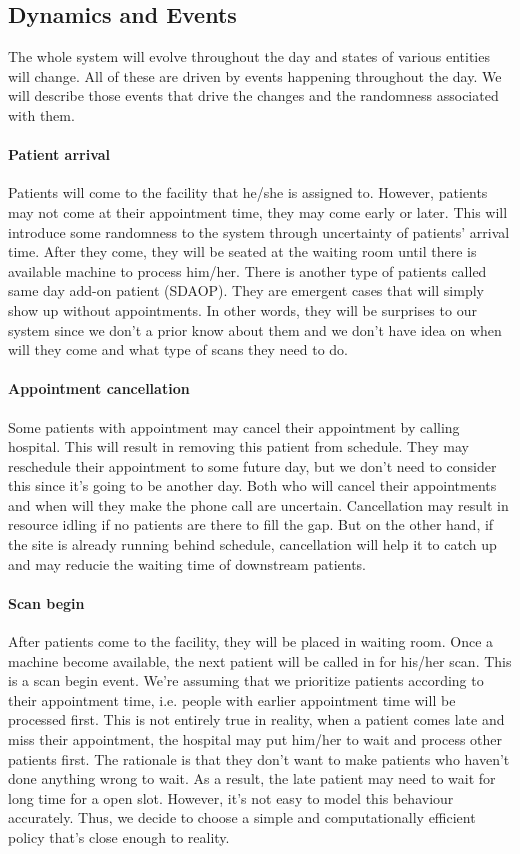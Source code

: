 \subsection{Dynamics and Events}

The whole system will evolve throughout the day and states of various entities will change. All of these are driven by events happening throughout the day. We will describe those events that drive the changes and the randomness associated with them.

\paragraph{Patient arrival} Patients will come to the facility that he/she is assigned to. However, patients may not come at their appointment time, they may come early or later. This will introduce some randomness to the system through uncertainty of patients' arrival time. After they come, they will be seated at the waiting room until there is available machine to process him/her. There is another type of patients called same day add-on patient (SDAOP). They are emergent cases that will simply show up without appointments. In other words, they will be surprises to our system since we don't a prior know about them and we don't have idea on when will they come and what type of scans they need to do.

\paragraph{Appointment cancellation} Some patients with appointment may cancel their appointment by calling hospital. This will result in
removing this patient from schedule. They may reschedule their appointment to some future day, but we don't need to consider this since it's going to be another day. Both who will cancel their appointments and when will they make the phone call are uncertain. Cancellation may result in resource idling if no patients are there to fill the gap. But on the other hand, if the site is already running behind schedule, cancellation will help it to catch up and may reducie the waiting time of downstream patients.

\paragraph{Scan begin} After patients come to the facility, they will be placed in waiting room. Once a machine become available, the next patient will be called in for his/her scan. This is a scan begin event. We're assuming that we prioritize patients according to their appointment time, i.e. people with earlier appointment time will be processed first. This is not entirely true in reality, when a patient comes late and miss their appointment, the hospital may put him/her to wait and process other patients first. The rationale is that they don't want to make patients who haven't done anything wrong to wait. As a result, the late patient may need to wait for long time for a open slot. However, it's not easy to model this behaviour accurately. Thus, we decide to choose a simple and computationally efficient policy that's close enough to reality.

